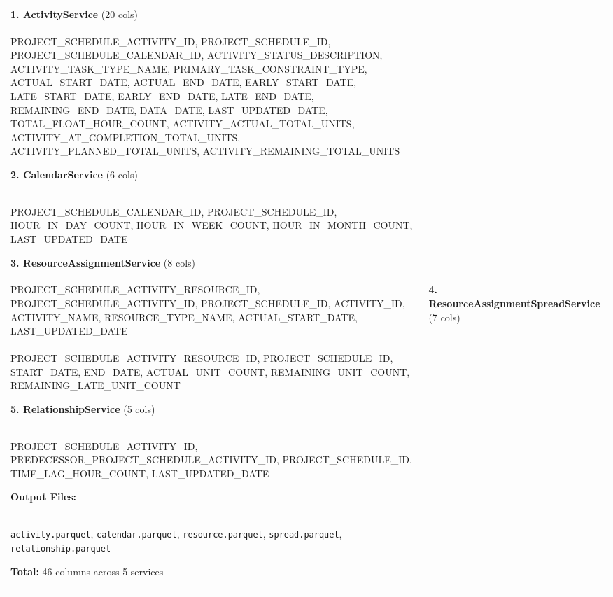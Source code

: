 \documentclass[10pt, a4paper]{article}
\begin{document}
{\scriptsize
\begin{tabular}[t]{@{}p{}@{\hspace{0.02\textwidth}}p{}@{}}
\vspace{0pt}
\raggedright

\textbf{1. ActivityService} (20 cols)\\
{\tiny
PROJECT\_SCHEDULE\_ACTIVITY\_ID, PROJECT\_SCHEDULE\_ID, PROJECT\_SCHEDULE\_CALENDAR\_ID, ACTIVITY\_STATUS\_DESCRIPTION, ACTIVITY\_TASK\_TYPE\_NAME, PRIMARY\_TASK\_CONSTRAINT\_TYPE, ACTUAL\_START\_DATE, ACTUAL\_END\_DATE, EARLY\_START\_DATE, LATE\_START\_DATE, EARLY\_END\_DATE, LATE\_END\_DATE, REMAINING\_END\_DATE, DATA\_DATE, LAST\_UPDATED\_DATE, TOTAL\_FLOAT\_HOUR\_COUNT, ACTIVITY\_ACTUAL\_TOTAL\_UNITS, ACTIVITY\_AT\_COMPLETION\_TOTAL\_UNITS, ACTIVITY\_PLANNED\_TOTAL\_UNITS, ACTIVITY\_REMAINING\_TOTAL\_UNITS
}

\vspace{0.15em}
\textbf{2. CalendarService} (6 cols)\\
{\tiny
PROJECT\_SCHEDULE\_CALENDAR\_ID, PROJECT\_SCHEDULE\_ID, HOUR\_IN\_DAY\_COUNT, HOUR\_IN\_WEEK\_COUNT, HOUR\_IN\_MONTH\_COUNT, LAST\_UPDATED\_DATE
}

\vspace{0.15em}
\textbf{3. ResourceAssignmentService} (8 cols)\\
{\tiny
PROJECT\_SCHEDULE\_ACTIVITY\_RESOURCE\_ID, PROJECT\_SCHEDULE\_ACTIVITY\_ID, PROJECT\_SCHEDULE\_ID, ACTIVITY\_ID, ACTIVITY\_NAME, RESOURCE\_TYPE\_NAME, ACTUAL\_START\_DATE, LAST\_UPDATED\_DATE
}

&
\vspace{0pt}
\raggedright

\textbf{4. ResourceAssignmentSpreadService} (7 cols)\\
{\tiny
PROJECT\_SCHEDULE\_ACTIVITY\_RESOURCE\_ID, PROJECT\_SCHEDULE\_ID, START\_DATE, END\_DATE, ACTUAL\_UNIT\_COUNT, REMAINING\_UNIT\_COUNT, REMAINING\_LATE\_UNIT\_COUNT
}

\vspace{0.15em}
\textbf{5. RelationshipService} (5 cols)\\
{\tiny
PROJECT\_SCHEDULE\_ACTIVITY\_ID, PREDECESSOR\_PROJECT\_SCHEDULE\_ACTIVITY\_ID, PROJECT\_SCHEDULE\_ID, TIME\_LAG\_HOUR\_COUNT, LAST\_UPDATED\_DATE
}

\vspace{0.25em}
\textbf{Output Files:}\\
{\tiny
\texttt{activity.parquet}, \texttt{calendar.parquet}, \texttt{resource.parquet}, \texttt{spread.parquet}, \texttt{relationship.parquet}
}

\vspace{0.15em}
\textbf{Total:} 46 columns across 5 services

\\
\end{tabular}
}

\vspace{0.1em}
\end{document}
